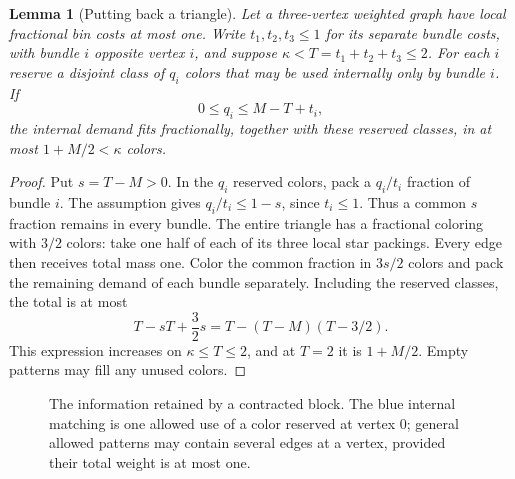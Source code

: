 \documentclass[11pt]{article}
\newtheorem{lemma}[theorem]{Lemma}
\theoremstyle{definition}\newtheorem{algorithm}{Algorithm}[section]
\numberwithin{equation}{section}
\theoremstyle{remark}\newtheorem*{remark}{Remark}
\begin{document}
\begin{lemma}[Putting back a triangle]\label{lem:subtwo-triangle}
Let a three-vertex weighted graph have local fractional bin costs
at most one. Write $t_1,t_2,t_3\le1$ for its separate bundle costs,
with bundle $i$ opposite vertex $i$, and suppose
$\kappa<T=t_1+t_2+t_3\le2$.
For each $i$ reserve a disjoint class of $q_i$ colors that may be
used internally only by bundle $i$. If
\[
 0\le q_i\le M-T+t_i,
\]
the internal demand fits fractionally, together with these reserved
classes, in at most $1+M/2<\kappa$ colors.
\end{lemma}
\begin{proof}
Put $s=T-M>0$. In the $q_i$ reserved colors, pack a $q_i/t_i$
fraction of bundle $i$. The assumption gives
$q_i/t_i\le1-s$, since $t_i\le1$.
Thus a common $s$ fraction remains in every bundle.
The entire triangle has a fractional coloring with $3/2$ colors:
take one half of each of its three local star packings. Every edge
then receives total mass one. Color the common fraction in $3s/2$
colors and pack the remaining demand of each bundle separately.
Including the reserved classes, the total is at most
\[
 T-sT+\frac32s
   =T-(T-M)(T-3/2).
\]
This expression increases on $\kappa\le T\le2$, and at $T=2$
it is $1+M/2$. Empty patterns may fill any unused colors.
\end{proof}

\begin{figure}[htbp]
\centering
{}
\caption{The information retained by a contracted block. The blue
internal matching is one allowed use of a color reserved at vertex
$0$; general allowed patterns may contain several edges at a vertex,
provided their total weight is at most one.}
\label{fig:subtwo-labels}
\end{figure}
\end{document}
